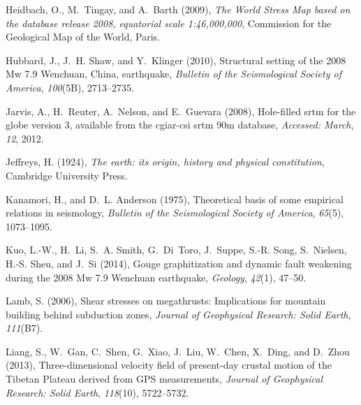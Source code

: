 \documentclass[twocolumn,jgrga]{AGUTeX}
\begin{document}
\begin{article}
{{\begin{thebibliography}{85}
Heidbach, O., M.~Tingay, and A.~Barth (2009), \textit{The World Stress Map
  based on the database release 2008, equatorial scale 1:46,000,000},
  Commission for the Geological Map of the World, Paris.

Hubbard, J., J.~H. Shaw, and Y.~Klinger (2010), Structural setting of the 2008
  {M}w 7.9 {W}enchuan, {C}hina, earthquake, \textit{Bulletin of the
  Seismological Society of America}, \textit{100}(5B), 2713--2735.

Jarvis, A., H.~Reuter, A.~Nelson, and E.~Guevara (2008), Hole-filled srtm for
  the globe version 3, available from the cgiar-csi srtm 90m database,
  \textit{Accessed: March}, \textit{12}, 2012.

Jeffreys, H. (1924), \textit{The earth: its origin, history and physical
  constitution}, Cambridge University Press.

Kanamori, H., and D.~L. Anderson (1975), Theoretical basis of some empirical
  relations in seismology, \textit{Bulletin of the Seismological Society of
  America}, \textit{65}(5), 1073--1095.

Kuo, L.-W., H.~Li, S.~A. Smith, G.~Di~Toro, J.~Suppe, S.-R. Song, S.~Nielsen,
  H.-S. Sheu, and J.~Si (2014), Gouge graphitization and dynamic fault
  weakening during the 2008 {M}w 7.9 {W}enchuan earthquake, \textit{Geology},
  \textit{42}(1), 47--50.

Lamb, S. (2006), Shear stresses on megathrusts: {I}mplications for mountain
  building behind subduction zones, \textit{Journal of Geophysical Research:
  Solid Earth}, \textit{111}(B7).

Liang, S., W.~Gan, C.~Shen, G.~Xiao, J.~Liu, W.~Chen, X.~Ding, and D.~Zhou
  (2013), Three-dimensional velocity field of present-day crustal motion of the
  {T}ibetan {P}lateau derived from {G}{P}{S} measurements, \textit{Journal of
  Geophysical Research: Solid Earth}, \textit{118}(10), 5722--5732.


\end{thebibliography}}}
\end{article}
\end{document}
